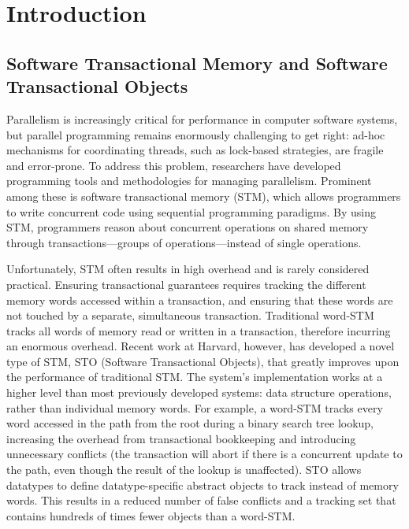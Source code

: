 \section{Introduction}
\subsection{Software Transactional Memory and Software Transactional Objects}
Parallelism is increasingly critical for performance in computer software systems, but parallel programming remains enormously challenging to get right: ad-hoc mechanisms for coordinating threads, such as lock-based strategies, are fragile and error-prone. To address this problem, researchers have developed programming tools and methodologies for managing parallelism. Prominent among these is software transactional memory (STM), which allows programmers to write concurrent code using sequential programming paradigms. By using STM, programmers reason about concurrent operations on shared memory through transactions---groups of operations---instead of single operations. 

Unfortunately, STM often results in high overhead and is rarely considered practical. Ensuring transactional guarantees requires tracking the different memory words accessed within a transaction, and ensuring that these words are not touched by a separate, simultaneous transaction. Traditional word-STM tracks all words of memory read or written in a transaction, therefore incurring an enormous overhead\cite{cascaval}. Recent work at Harvard, however, has developed a novel type of STM, STO (Software Transactional Objects)\cite{sto}, that greatly improves upon the performance of traditional STM. The system's implementation works at a higher level than most previously developed systems: data structure operations, rather than individual memory words. For example, a word-STM tracks every word accessed in the path from the root during a binary search tree lookup, increasing the overhead from transactional bookkeeping and introducing unnecessary conflicts (the transaction will abort if there is a concurrent update to the path, even though the result of the lookup is unaffected). STO allows datatypes to define datatype-specific abstract objects to track instead of memory words. This results in a reduced number of false conflicts and a tracking set that contains hundreds of times fewer objects than a word-STM. 

